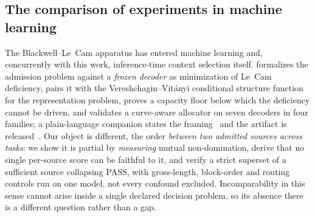 \documentclass[11pt]{article}
\theoremstyle{plain}
\theoremstyle{definition}
\theoremstyle{remark}
\begin{document}
\subsection{The comparison of experiments in machine learning}
\label{sec:related-deficiency}\label{sec:related-llmrep}\label{sec:related-foundations}

The Blackwell--Le~Cam apparatus has entered machine learning and, concurrently with this work,
inference-time context selection itself. \citet{alpila2026} formalizes the admission problem
against a \emph{frozen decoder} as minimization of Le~Cam deficiency, pairs it with the
Vereshchagin--Vit\'anyi conditional structure function for the representation problem, proves a
capacity floor below which the deficiency cannot be driven, and validates a curve-aware allocator
on seven decoders in four families; a plain-language companion states the
framing~\citep{alpila2026essay} and the artifact is released~\citep{alpila2026lmrecall}. Our
object is different, the order \emph{between two admitted sources across tasks}: we show it is partial by \emph{measuring}
mutual non-domination, derive that no single per-source score can be faithful to it, and verify a
strict superset of a sufficient source collapsing PASS, with gross-length, block-order and routing
controls run on one model, not every confound excluded. Incomparability in this sense
cannot arise inside a single declared decision problem, so its absence there is a different
question rather than a gap.
\end{document}
